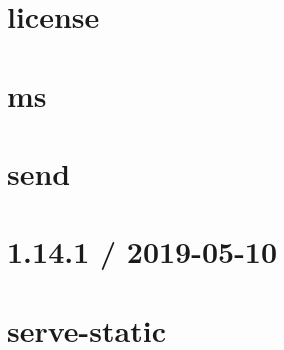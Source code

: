 \let\mypdfximage\pdfximage\def\pdfximage{\immediate\mypdfximage}\documentclass[twoside]{book}
\newcommand{\+}{\discretionary{\mbox{\scriptsize$\hookleftarrow$}}{}{}}
\begin{document}
\chapter{license}
\label{md__c_1__git_hub__p_r_o_y_e_c_t_o-_i_i_i-_g_o_t_rest-api-node-mysql_node_modules_send_node_modules_ms_license}

\chapter{ms}
\label{md__c_1__git_hub__p_r_o_y_e_c_t_o-_i_i_i-_g_o_t_rest-api-node-mysql_node_modules_send_node_modules_ms_readme}

\chapter{send}
\label{md__c_1__git_hub__p_r_o_y_e_c_t_o-_i_i_i-_g_o_t_rest-api-node-mysql_node_modules_send__r_e_a_d_m_e}

\chapter{1.14.1 / 2019-\/05-\/10}
\label{md__c_1__git_hub__p_r_o_y_e_c_t_o-_i_i_i-_g_o_t_rest-api-node-mysql_node_modules_serve-static__h_i_s_t_o_r_y}

\chapter{serve-\/static}
\label{md__c_1__git_hub__p_r_o_y_e_c_t_o-_i_i_i-_g_o_t_rest-api-node-mysql_node_modules_serve-static__r_e_a_d_m_e}

\end{document}
